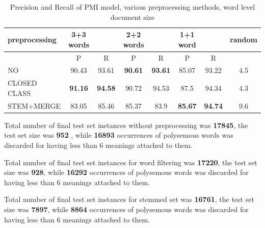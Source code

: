 \begin{table}[h!]
\begin{tabular}{ l | c c | c c | c c | c}
   preprocessing &  3+3 words && 2+2 words && 1+1 word  && random\\
\hline\hline
	& P  &  R & P  &  R & P  &  R &\\
\hline
NO & 90.43   &  93.61 & \textbf{90.61}  &  \textbf{93.61} & 85.07  & 93.22  & 4.5\\
CLOSED CLASS &  \textbf{91.16} & \textbf{94.58}  & 90.72  & 94.53  & 87.5  & 94.34  & 4.3\\
STEM+MERGE  & 83.05  &  85.46 & 85.37  & 83.9  & \textbf{85.67}  & \textbf{94.74}  & 9.6\\
\end{tabular}
\caption{Precision and Recall of PMI model,  various preprocessing methods, word level document size}
\end{table}

Total number of final test set instances without preprocessing was  \textbf{17845}, the test set size was \textbf{952} , while \textbf{16893} occurrences of polysemous words was discarded for having less than 6 meanings attached to them.

Total number of final test set instances for word filtering was  \textbf{17220}, the test set size was \textbf{928}, while \textbf{16292} occurrences of polysemous words was discarded for having less than 6 meanings attached to them.

Total number of final test set instances for stemmed set was  \textbf{16761}, the test set size was \textbf{7897}, while \textbf{8864} occurrences of polysemous words was discarded for having less than 6 meanings attached to them.
